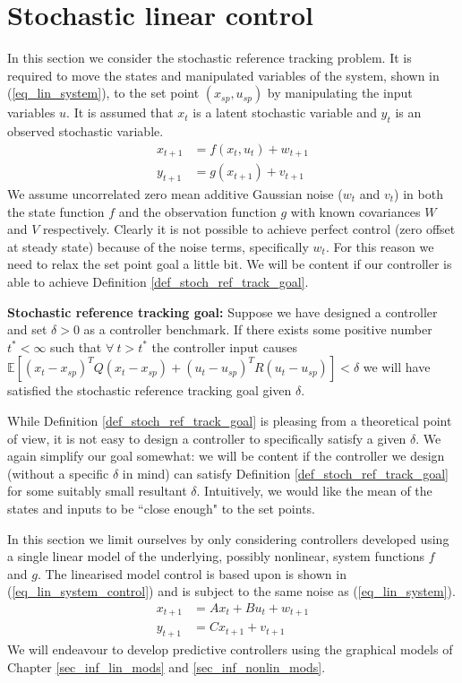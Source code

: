 \chapter{Stochastic linear control}
\label{sec_linear_control}
In this section we consider the stochastic reference tracking problem. It is required to move the states and manipulated variables of the system, shown in (\ref{eq_lin_system}), to the set point $(x_{sp}, u_{sp})$ by manipulating the input variables $u$. It is assumed that $x_t$ is a latent stochastic variable and $y_t$ is an observed stochastic variable.
\begin{equation}
\begin{aligned}
x_{t+1} &= f(x_t, u_t) + w_{t+1}  \\
y_{t+1} &= g(x_{t+1}) + v_{t+1}  
\end{aligned}
\label{eq_lin_system}
\end{equation}
We assume uncorrelated zero mean additive Gaussian noise ($w_t$ and $v_t$) in both the state function $f$ and the observation function $g$ with known covariances $W$ and $V$ respectively. Clearly it is not possible to achieve perfect control (zero offset at steady state) because of the noise terms, specifically $w_t$. For this reason we need to relax the set point goal a little bit. We will be content if our controller is able to achieve Definition \ref{def_stoch_ref_track_goal}.
\begin{defn}
\textbf{Stochastic reference tracking goal:} Suppose we have designed a controller and set $\delta > 0$ as a controller benchmark. If there exists some positive number $t^* < \infty$ such that $\forall~t > t^*$ the controller input causes $\mathbb{E}[(x_t-x_{sp})^TQ(x_t-x_{sp}) + (u_t-u_{sp})^TR(u_t-u_{sp})] < \delta$ we will have satisfied the stochastic reference tracking goal given $\delta$.
\label{def_stoch_ref_track_goal}
\end{defn}
While Definition \ref{def_stoch_ref_track_goal} is pleasing from a theoretical point of view, it is not easy to design a controller to specifically satisfy a given $\delta$. We again simplify our goal somewhat: we will be content if the controller we design (without a specific $\delta$ in mind) can satisfy Definition \ref{def_stoch_ref_track_goal} for some suitably small resultant  $\delta$. Intuitively, we would like the mean of the states and inputs to be ``close enough" to the set points. 

In this section we limit ourselves by only considering controllers developed using a single linear model of the underlying, possibly nonlinear, system functions $f$ and $g$. The linearised model control is based upon is shown in (\ref{eq_lin_system_control}) and is subject to the same noise as (\ref{eq_lin_system}).
\begin{equation}
\begin{aligned}
x_{t+1} &= Ax_t + Bu_t + w_{t+1} \\
y_{t+1} &= Cx_{t+1} + v_{t+1} 
\end{aligned}
\label{eq_lin_system_control}
\end{equation}
We will endeavour to develop predictive controllers using the graphical models of Chapter \ref{sec_inf_lin_mods} and \ref{sec_inf_nonlin_mods}.

